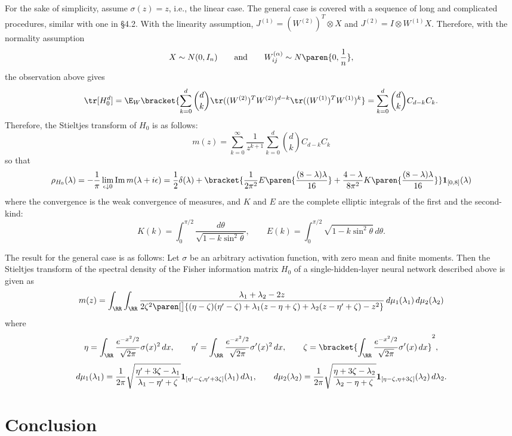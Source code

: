 \documentclass[notitlepage]{report}
\begin{document}
For the sake of simplicity, assume $\sigma(z) = z$, i.e., the linear case. The general case is covered with a sequence of long and complicated procedures, similar with one in \S4.2. With the linearity assumption, $J^{(1)} = (W^{(2)})^T\otimes X$ and $J^{(2)} = I\otimes W^{(1)}X$. Therefore, with the normality assumption
\[ X\sim N(0,I_n)\qquad \text{and}\qquad W_{ij}^{(\alpha)} \sim N\paren{0,\frac 1n} ,\]
the observation above gives
\[ \tr[H_0^d] = \E_W\bracket{ \sum_{k=0}^d  \binom d k \tr((W^{(2)})^T W^{(2)})^{d-k} \tr((W^{(1)})^T W^{(1)})^k} = \sum_{k=0}^d  \binom d k C_{d-k}C_k. \]
Therefore, the Stieltjes transform of $H_0$ is as follows:
\[ m(z) = \sum_{k=0}^\infty \frac{1}{z^{k+1}} \sum_{k=0}^d \binom d k C_{d-k } C_k \]
so that
\[ \rho_{H_0}(\lambda) = -\frac 1\pi \lim_{\epsilon\downarrow 0} \operatorname{Im} m(\lambda + i\epsilon) = \frac 1 2 \delta(\lambda) + \bracket{\frac 1 {2\pi^2} E\paren{\frac {(8-\lambda)\lambda} {16}} + \frac{4-\lambda}{8\pi^2} K\paren{\frac{(8-\lambda)\lambda} {16} } } \mathbf 1_{[0,8]}(\lambda) \]
where the convergence is the weak convergence of measures, and $K$ and $E$ are the complete elliptic integrals of the first and the second-kind:
\[ K(k) = \int_0^{\pi/2} \frac{d\theta}{\sqrt{1 - k\sin^2\theta}},\qquad E(k) = \int_0^{\pi/2} \sqrt{1 - k\sin^2\theta}\,d\theta. \]

The result for the general case is as follows: Let $\sigma$ be an arbitrary activation function, with zero mean and finite moments. Then the Stieltjes transform of the spectral density of the Fisher information matrix $H_0$ of a single-hidden-layer neural network described above is given as
\[ m(z) = \int_\RR \int_\RR \frac{\lambda_1 + \lambda_2 - 2z}{2\zeta^2\paren[\big]{ (\eta - \zeta)(\eta' - \zeta) +\lambda_1 (z-\eta+\zeta) + \lambda_2(z-\eta'+\zeta) - z^2 }}\,d\mu_1(\lambda_1)\,d\mu_2(\lambda_2) \]
where
\[ \eta = \int_\RR \frac{e^{-x^2/2}}{\sqrt{2\pi}} \sigma(x)^2\,dx,\qquad \eta' = \int_\RR \frac{e^{-x^2/2}}{\sqrt{2\pi}} \sigma'(x)^2\,dx, \qquad \zeta = \bracket{\int_\RR \frac{e^{-x^2/2}}{\sqrt{2\pi}} \sigma'(x)\,dx}^2, \]
\[ d\mu_1(\lambda_1) = \frac 1{2\pi} \sqrt{\eta' + 3\zeta - \lambda_1 \over \lambda_1 - \eta' + \zeta} \mathbf 1_{[\eta' - \zeta,\eta' + 3\zeta]}(\lambda_1)\,d\lambda_1,\qquad d\mu_2(\lambda_2) = \frac 1{2\pi} \sqrt{\eta + 3\zeta - \lambda_2 \over \lambda_2 - \eta + \zeta} \mathbf 1_{[\eta - \zeta,\eta + 3\zeta]}(\lambda_2)\,d\lambda_2. \]


\section{Conclusion}
\end{document}
